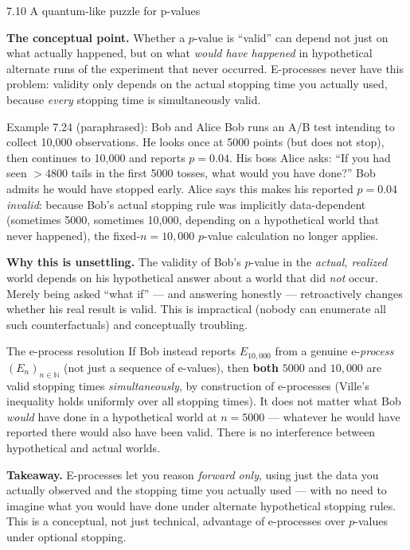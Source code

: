 \documentclass[aspectratio=169,10pt]{beamer}
\newcommand{\Nmb}{\mathbb{N}}
\begin{document}
\begin{frame}[allowframebreaks]{7.10 A quantum-like puzzle for p-values}

\textbf{The conceptual point.} Whether a $p$-value is ``valid'' can depend not just on what actually happened, but
on what \emph{would have happened} in hypothetical alternate runs of the experiment that never occurred. E-processes
never have this problem: validity only depends on the actual stopping time you actually used, because \emph{every}
stopping time is simultaneously valid.

\begin{block}{Example 7.24 (paraphrased): Bob and Alice}
Bob runs an A/B test intending to collect 10{,}000 observations. He looks once at 5000 points (but does not stop),
then continues to 10{,}000 and reports $p=0.04$. His boss Alice asks: ``If you had seen $>4800$ tails in the first
5000 tosses, what would you have done?'' Bob admits he would have stopped early. Alice says this makes his reported
$p=0.04$ \emph{invalid}: because Bob's actual stopping rule was implicitly data-dependent (sometimes 5000, sometimes
10{,}000, depending on a hypothetical world that never happened), the fixed-$n=10{,}000$ $p$-value calculation no
longer applies.
\end{block}

\framebreak

\textbf{Why this is unsettling.} The validity of Bob's $p$-value in the \emph{actual, realized} world depends on
his hypothetical answer about a world that did \emph{not} occur. Merely being asked ``what if'' --- and answering
honestly --- retroactively changes whether his real result is valid. This is impractical (nobody can enumerate
all such counterfactuals) and conceptually troubling.

\begin{block}{The e-process resolution}
If Bob instead reports $E_{10{,}000}$ from a genuine e-\emph{process} $(E_n)_{n\in\Nmb}$ (not just a sequence of
e-values), then \textbf{both} $5000$ and $10{,}000$ are valid stopping times \emph{simultaneously}, by construction
of e-processes (Ville's inequality holds uniformly over all stopping times). It does not matter what Bob
\emph{would} have done in a hypothetical world at $n=5000$ --- whatever he would have reported there would also
have been valid. There is no interference between hypothetical and actual worlds.
\end{block}

\textbf{Takeaway.} E-processes let you reason \emph{forward only}, using just the data you actually observed and
the stopping time you actually used --- with no need to imagine what you would have done under alternate
hypothetical stopping rules. This is a conceptual, not just technical, advantage of e-processes over $p$-values
under optional stopping.


\end{frame}
\end{document}
